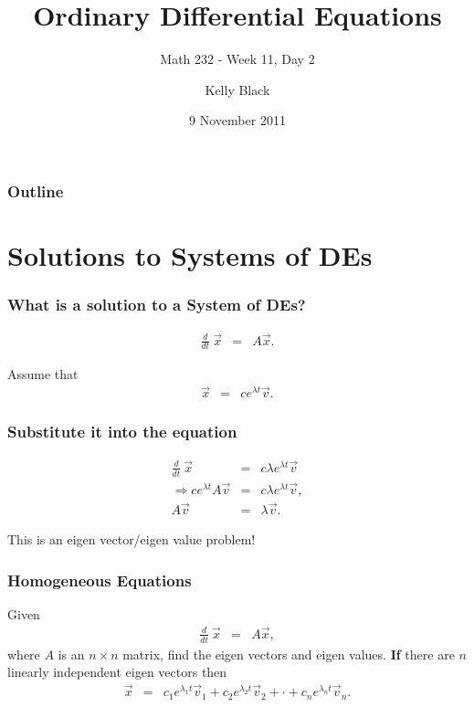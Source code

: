 \documentclass{beamer}
\newcommand{\deriv}[2]{\frac{d}{d#2}#1}
\begin{document}
\title{Ordinary Differential Equations}
\subtitle{Math 232 - Week 11, Day 2}

\author{Kelly Black}
\date{9 November 2011}

\begin{frame}
  \titlepage
\end{frame}

\begin{frame}
  \frametitle{Outline}
\end{frame}


\section{Solutions to Systems of DEs}


\begin{frame}
  \frametitle{What is a solution to a System of DEs?}

  \begin{eqnarray*}
    \deriv{~}{t} \vec{x} & = & A \vec{x}.
  \end{eqnarray*}

  {
    Assume that 
    \begin{eqnarray*}
      \vec{x} & = & c e^{\lambda t} \vec{v}.
    \end{eqnarray*}
  }


\end{frame}


\begin{frame}
  \frametitle{Substitute it into the equation}

  \begin{eqnarray*}
    \deriv{~}{t} \vec{x} & = & c \lambda e^{\lambda t} \vec{v} \\
    \Rightarrow c  e^{\lambda t} A \vec{v} & = & c \lambda e^{\lambda t} \vec{v}, \\
    A \vec{v} & = & \lambda \vec{v}.
  \end{eqnarray*}

  This is an eigen vector/eigen value problem!

\end{frame}


\begin{frame}
  \frametitle{Homogeneous Equations}

  Given
  \begin{eqnarray*}
    \deriv{~}{t} \vec{x} & = & A \vec{x},
  \end{eqnarray*}
  where $A$ is an $n\times n$ matrix, find the eigen vectors and eigen
  values. \textbf{If} there are $n$ linearly independent eigen vectors
  then 
  \begin{eqnarray*}
    \vec{x} & = & c_1 e^{\lambda_1 t} \vec{v}_1 + c_2 e^{\lambda_2 t} \vec{v}_2 +
    \cdot + c_n e^{\lambda_n t} \vec{v}_n.
  \end{eqnarray*}

\end{frame}
\end{document}

